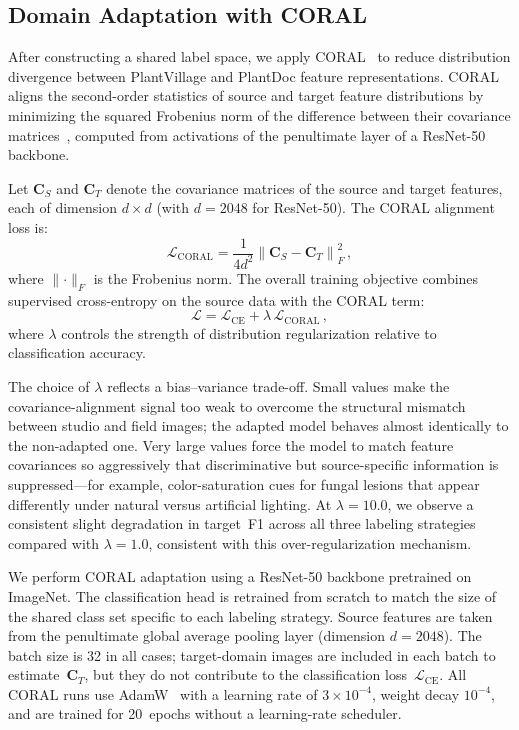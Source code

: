 \subsection{Domain Adaptation with CORAL}

After constructing a shared label space, we apply CORAL~\cite{sun2016coral}
to reduce distribution divergence between PlantVillage and PlantDoc feature
representations. CORAL aligns the second-order statistics of source and target
feature distributions by minimizing the squared Frobenius norm of the
difference between their covariance matrices~\cite{sun2015return}, computed
from activations of the penultimate layer of a ResNet-50 backbone.

Let $\mathbf{C}_S$ and $\mathbf{C}_T$ denote the covariance matrices of the
source and target features, each of dimension $d \times d$ (with $d = 2048$
for ResNet-50). The CORAL alignment loss is:
%
\begin{equation}
  \mathcal{L}_{\mathrm{CORAL}}
    = \frac{1}{4d^{2}}
      \left\lVert \mathbf{C}_S - \mathbf{C}_T \right\rVert_F^{2}\,,
  \label{eq:coral}
\end{equation}
%
where $\lVert \cdot \rVert_F$ is the Frobenius norm. The overall training
objective combines supervised cross-entropy on the source data with the
CORAL term:
%
\begin{equation}
  \mathcal{L}
    = \mathcal{L}_{\mathrm{CE}}
    + \lambda \, \mathcal{L}_{\mathrm{CORAL}}\,,
  \label{eq:total_loss}
\end{equation}
%
where $\lambda$ controls the strength of distribution regularization relative
to classification accuracy.

The choice of $\lambda$ reflects a bias--variance trade-off. Small values make
the covariance-alignment signal too weak to overcome the structural mismatch
between studio and field images; the adapted model behaves almost identically
to the non-adapted one. Very large values force the model to match feature
covariances so aggressively that discriminative but source-specific information
is suppressed---for example, color-saturation cues for fungal lesions that
appear differently under natural versus artificial lighting. At
$\lambda = 10.0$, we observe a consistent slight degradation in target~F1
across all three labeling strategies compared with $\lambda = 1.0$, consistent
with this over-regularization mechanism.

We perform CORAL adaptation using a ResNet-50 backbone pretrained on ImageNet.
The classification head is retrained from scratch to match the size of the
shared class set specific to each labeling strategy. Source features are taken
from the penultimate global average pooling layer (dimension $d = 2048$). The
batch size is 32 in all cases; target-domain images are included in each batch
to estimate~$\mathbf{C}_T$, but they do not contribute to the classification
loss~$\mathcal{L}_{\mathrm{CE}}$. All CORAL runs use
AdamW~\cite{loshchilov2019adamw} with a learning rate of $3 \times 10^{-4}$,
weight decay $10^{-4}$, and are trained for 20~epochs without a learning-rate
scheduler.
